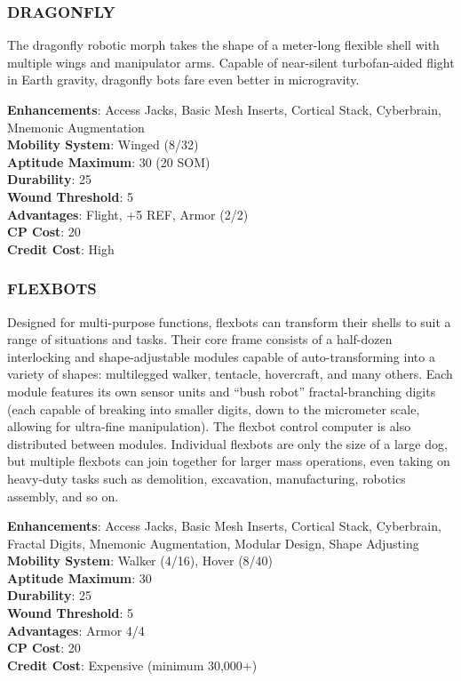 \subsubsection{DRAGONFLY}
The dragonfly robotic morph takes the shape of a meter-long flexible shell with
multiple wings and manipulator arms. Capable of near-silent turbofan-aided
flight in Earth gravity, dragonfly bots fare even better in microgravity.

\textbf{Enhancements}: Access Jacks, Basic Mesh Inserts, Cortical Stack, Cyberbrain, Mnemonic Augmentation \\
\textbf{Mobility System}: Winged (8/32) \\
\textbf{Aptitude Maximum}: 30 (20 SOM) \\
\textbf{Durability}: 25 \\
\textbf{Wound Threshold}: 5 \\
\textbf{Advantages}: Flight, +5 REF, Armor (2/2)\\
\textbf{CP Cost}: 20 \\
\textbf{Credit Cost}: High

\subsubsection{FLEXBOTS}
Designed for multi-purpose functions, flexbots can transform their shells to
suit a range of situations and tasks. Their core frame consists of a half-dozen
interlocking and shape-adjustable modules capable of auto-transforming into a
variety of shapes: multilegged walker, tentacle, hovercraft, and many others.
Each module features its own sensor units and “bush robot” fractal-branching
digits (each capable of breaking into smaller digits, down to the micrometer
scale, allowing for ultra-fine manipulation). The flexbot control computer is
also distributed between modules.  Individual flexbots are only the size of a
large dog, but multiple flexbots can join together for larger mass operations,
even taking on heavy-duty tasks such as demolition, excavation, manufacturing,
robotics assembly, and so on.

\textbf{Enhancements}: Access Jacks, Basic Mesh Inserts, Cortical Stack, Cyberbrain, Fractal Digits, Mnemonic Augmentation, Modular Design, Shape Adjusting \\
\textbf{Mobility System}: Walker (4/16), Hover (8/40) \\
\textbf{Aptitude Maximum}: 30 \\
\textbf{Durability}: 25 \\
\textbf{Wound Threshold}: 5 \\
\textbf{Advantages}: Armor 4/4 \\
\textbf{CP Cost}: 20 \\
\textbf{Credit Cost}: Expensive (minimum 30,000+)

